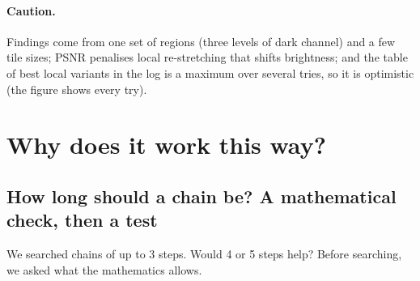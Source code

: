 \documentclass[10pt,a4paper]{article}
\begin{document}
\paragraph{Caution.} Findings come from one set of regions (three levels of dark channel) and a few tile sizes; PSNR penalises local re-stretching that shifts brightness; and the table of best local variants in the log is a maximum over several tries, so it is optimistic (the figure shows every try).

\section{Why does it work this way?}\label{sec:why}
\subsection{How long should a chain be? A mathematical check, then a test}
\label{sec:chainlength}
We searched chains of up to 3 steps. Would 4 or 5 steps help? Before searching, we asked what the mathematics allows.
\end{document}

